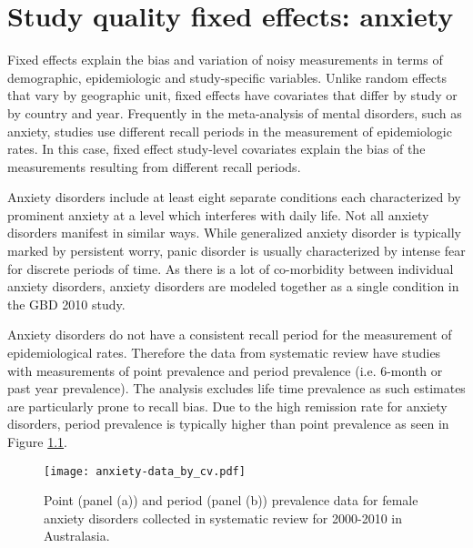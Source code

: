 \chapter{Study quality fixed effects: anxiety}
\label{applications-efx_study_level}

Fixed effects explain the bias and variation of noisy measurements in
terms of demographic, epidemiologic and study-specific variables.
Unlike random effects that vary by geographic unit, fixed effects have
covariates that differ by study or by country and year.  Frequently in
the meta-analysis of mental disorders, such as anxiety, studies use
different recall periods in the measurement of epidemiologic rates.
In this case, fixed effect study-level covariates explain the bias of
the measurements resulting from different recall periods.

Anxiety disorders include at least eight separate conditions each
characterized by prominent anxiety at a level which interferes with
daily life.  Not all anxiety disorders manifest in similar ways.
While generalized anxiety disorder is typically marked by persistent
worry, panic disorder is usually characterized by intense fear for
discrete periods of time. \cite{american_diagnostic_2000} As there is
a lot of co-morbidity between individual anxiety disorders, anxiety
disorders are modeled together as a single condition in the GBD 2010
study.

Anxiety disorders do not have a consistent recall period for the
measurement of epidemiological rates.  Therefore the data from
systematic review have studies with measurements of point prevalence
and period prevalence (i.e. 6-month or past year prevalence).  The
analysis excludes life time prevalence as such estimates are
particularly prone to recall bias.  Due to the high remission rate for
anxiety disorders, period prevalence is typically higher than point
prevalence as seen in Figure \ref{fig:app-anxiety data}.

    \begin{figure}[h]
        \begin{center}
            \texttt{[image: anxiety-data\_by\_cv.pdf]}
            \caption{Point (panel (a)) and period (panel (b)) prevalence data 
              for female anxiety disorders collected in systematic review for
              2000-2010 in Australasia.}
            \label{fig:app-anxiety data}
        \end{center}
    \end{figure}

